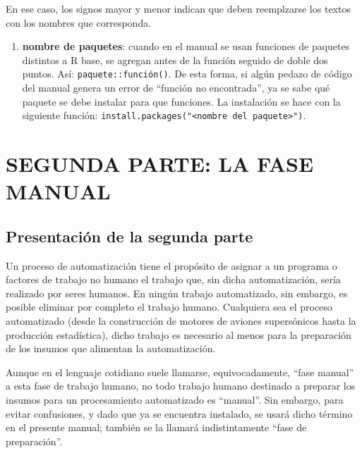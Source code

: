 \documentclass[
  spanish,
]{book}
\providecommand{\tightlist}{%
  \setlength{\itemsep}{0pt}\setlength{\parskip}{0pt}}
\begin{document}
En ese caso, los signos mayor y menor indican que deben reemplzarse los textos con los nombres que corresponda.

\begin{enumerate}
\def\labelenumi{\alph{enumi})}
\setcounter{enumi}{1}
\tightlist
\item
  \textbf{nombre de paquetes}: cuando en el manual se usan funciones de paquetes distintos a R base, se agregan antes de la función seguido de doble dos puntos. Así: \texttt{paquete::función()}. De esta forma, si algún pedazo de código del manual genera un error de ``función no encontrada'', ya se sabe qué paquete se debe instalar para que funciones. La instalación se hace con la siguiente función: \texttt{install.packages("\textless{}nombre\ del\ paquete\textgreater{}")}.
\end{enumerate}

\hypertarget{part-segunda-parte-la-fase-manual}{%
\part*{SEGUNDA PARTE: LA FASE MANUAL}\label{part-segunda-parte-la-fase-manual}}

\hypertarget{presentaciuxf3n-de-la-segunda-parte}{%
\chapter*{Presentación de la segunda parte}\label{presentaciuxf3n-de-la-segunda-parte}}

Un proceso de automatización tiene el propósito de asignar a un programa o factores de trabajo no humano el trabajo que, sin dicha automatización, sería realizado por seres humanos. En ningún trabajo automatizado, sin embargo, es posible eliminar por completo el trabajo humano. Cualquiera sea el proceso automatizado (desde la construcción de motores de aviones supersónicos hasta la producción estadística), dicho trabajo es necesario al menos para la preparación de los insumos que alimentan la automatización.

Aunque en el lenguaje cotidiano suele llamarse, equivocadamente, ``fase manual'' a esta fase de trabajo humano, no todo trabajo humano destinado a preparar los insumos para un procesamiento automatizado es ``manual''. Sin embargo, para evitar confusiones, y dado que ya se encuentra instalado, se usará dicho término en el presente manual; también se la llamará indistintamente ``fase de preparación''.
\end{document}
